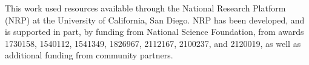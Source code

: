 This work used resources available through the National Research Platform (NRP) at the University of California, San Diego. NRP has been developed, and is supported in part, by funding from National Science Foundation, from awards 1730158, 1540112, 1541349, 1826967, 2112167, 2100237, and 2120019, as well as additional funding from community partners.
\citep{Weitzel2025national}

